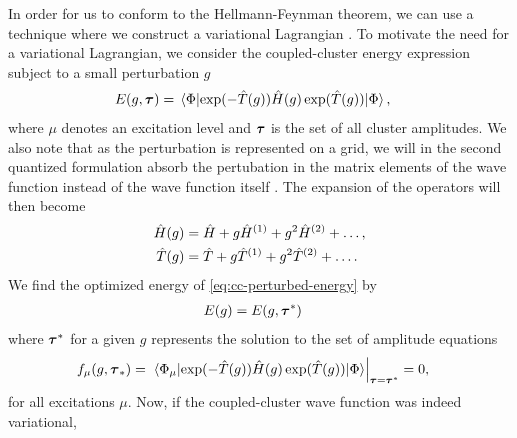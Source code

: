             In order for us to conform to the Hellmann-Feynman theorem, we can
            use a technique where we construct a variational Lagrangian
            \cite{helgaker1989, helgaker-molecular}.
            To motivate the need for a variational Lagrangian, we consider the
            coupled-cluster energy expression subject to a small perturbation
            $g$ \cite{monkhorst1977421}
            \begin{align}
                E(g, \vfg{\clustamp})
                &= \mel*{\slat}{
                    \exponential(-\clust(g))
                    \hamil(g)
                    \exponential(\clust(g))
                }{\slat},
                \label{eq:cc-perturbed-energy}
            \end{align}
            where $\mu$ denotes an excitation level and $\boldsymbol{\tau}$ is the
            set of all cluster amplitudes.
            We also note that as the perturbation is represented on a grid, we
            will in the second quantized formulation absorb the pertubation in
            the matrix elements of the wave function instead of the wave
            function itself \cite{helgaker-molecular}.
            The expansion of the operators will then become
            \cite{monkhorst1977421}
            \begin{align}
                \hat{H}(g) &= \hat{H} + g\hat{H}^{(1)} + g^2\hat{H}^{(2)} + \dots, \\
                \hat{T}(g) &= \hat{T} + g\hat{T}^{(1)} + g^2\hat{T}^{(2)} + \dots.
            \end{align}
            We find the optimized energy of \autoref{eq:cc-perturbed-energy} by
            \begin{align}
                E(g) &= E(g, \boldsymbol{\tau}^{*})
            \end{align}
            where $\boldsymbol{\tau}^{*}$ for a given $g$ represents the solution
            to the set of amplitude equations
            \begin{align}
                f_{\mu}(g, \vfg{\clustamp}_{*})
                &=
                \left.
                \mel*{\Phi_{\mu}}{
                    \exponential(-\clust(g))
                    \hamil(g)
                    \exponential(\clust(g))
                }{\slat}
                \right\rvert_{\vfg{\clustamp} = \vfg{\clustamp}^{*}}
                = 0,
                \label{eq:cc-amplitude-set}
            \end{align}
            for all excitations $\mu$.
            Now, if the coupled-cluster wave function was indeed variational,
